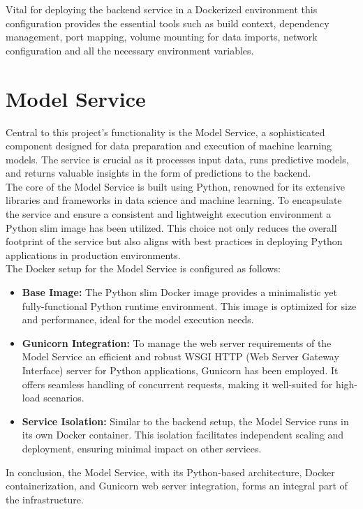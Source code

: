 Vital for deploying the backend service in a Dockerized environment this configuration provides the essential tools such as build context, dependency management, port mapping, volume mounting for data imports, network configuration and all the necessary environment variables.


\section{Model Service}
Central to this project's functionality is the Model Service, a sophisticated component designed for data preparation and execution of machine learning models. The service is crucial as it processes input data, runs predictive models, and returns valuable insights in the form of predictions to the backend.\\

The core of the Model Service is built using Python, renowned for its extensive libraries and frameworks in data science and machine learning. To encapsulate the service and ensure a consistent and lightweight execution environment a Python slim image has been utilized. This choice not only reduces the overall footprint of the service but also aligns with best practices in deploying Python applications in production environments. \\

The Docker setup for the Model Service is configured as follows:

\begin{itemize}
  \item \textbf{Base Image:} The Python slim Docker image provides a minimalistic yet fully-functional Python runtime environment. This image is optimized for size and performance, ideal for the model execution needs.
  \item \textbf{Gunicorn Integration:} To manage the web server requirements of the Model Service an efficient and robust WSGI HTTP (Web Server Gateway Interface) server for Python applications, Gunicorn \cite{GunicornWebsite} has been employed. It offers seamless handling of concurrent requests, making it well-suited for high-load scenarios.
  \item \textbf{Service Isolation:} Similar to the backend setup, the Model Service runs in its own Docker container. This isolation facilitates independent scaling and deployment, ensuring minimal impact on other services.
\end{itemize}

In conclusion, the Model Service, with its Python-based architecture, Docker containerization, and Gunicorn web server integration, forms an integral part of the infrastructure. 

